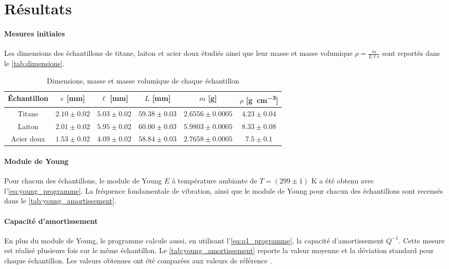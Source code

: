 \section{Résultats}

\paragraph{Mesures initiales} Les dimensions des échantillons de titane, laiton et acier doux étudiés ainsi que leur masse et masse volumique \(\rho = \frac{m}{L \ell e}\) sont reportés dans le \autoref{tab:dimensions}.

\begin{table}[h]
    \centering
    \begin{tabulary}{0.7\linewidth}{c|c c c c c}
        \toprule
        Échantillon & \(e\) [\si{\milli\meter}] & \(\ell\) [\si{\milli\meter}] & \(L\) [\si{\milli\meter}] & \(m\) [\si{\gram}] & \(\rho\) [\si{\gram\per\cubic\centi\meter}] \\
        \midrule
        Titane & \(2.10 \pm 0.02\) & \(5.03 \pm 0.02\) & \(59.38 \pm 0.03\) & \(2.6556 \pm 0.0005\) & \(4.23 \pm 0.04\) \\
        Laiton & \(2.01 \pm 0.02\) & \(5.95 \pm 0.02\) & \(60.00 \pm 0.03\) & \(5.9803 \pm 0.0005\) & \(8.33 \pm 0.08\) \\
        Acier doux & \(1.53 \pm 0.02\) & \(4.09 \pm 0.02\) & \(58.84 \pm 0.03\) & \(2.7658 \pm 0.0005\) & \(7.5 \pm 0.1\) \\
        \bottomrule
    \end{tabulary}
    \caption{Dimensions, masse et masse volumique de chaque échantillon}
    \label{tab:dimensions}
\end{table}

\paragraph{Module de Young} Pour chacun des échantillons, le module de Young \(E\) à température ambiante de \(T = (299 \pm 1)\) \si{\kelvin} a été obtenu avec l'\autoref{eq:young_programme}. La fréquence fondamentale de vibration, ainsi que le module de Young pour chacun des échantillons sont recensés dans le \autoref{tab:young_amortissement}.

\paragraph{Capacité d'amortissement} En plus du module de Young, le programme calcule aussi, en utilisant l'\autoref{eq:q1_programme}, la capacité d'amortissement \(Q^{-1}\). Cette mesure est réalisé plusieurs fois sur le même échantillon. Le \autoref{tab:young_amortissement} reporte la valeur moyenne et la déviation standard pour chaque échantillon. Les valeurs obtenues ont été comparées aux valeurs de référence \cite{notice-d1}.

